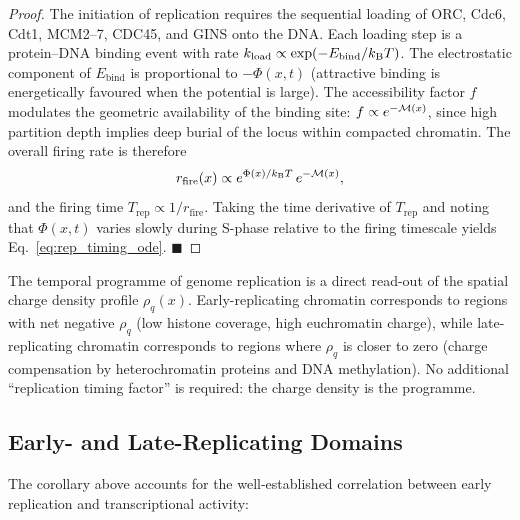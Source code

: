 \begin{proof}
The initiation of replication requires the sequential loading of ORC, Cdc6,
Cdt1, MCM2--7, CDC45, and GINS onto the DNA. Each loading step is a
protein--DNA binding event with rate
$k_{\mathrm{load}} \propto \exp(-E_{\mathrm{bind}}/k_{\mathrm{B}} T)$.
The electrostatic component of $E_{\mathrm{bind}}$ is proportional to
$-\Phi(x,t)$ (attractive binding is energetically favoured when the potential
is large). The accessibility factor $f$ modulates the geometric availability
of the binding site: $f \propto e^{-\mathcal{M}(x)}$, since high partition depth
implies deep burial of the locus within compacted chromatin. The overall firing
rate is therefore
\begin{equation}
  r_{\mathrm{fire}}(x) \propto e^{\Phi(x)/k_{\mathrm{B}} T}\,e^{-\mathcal{M}(x)},
\end{equation}
and the firing time $T_{\mathrm{rep}} \propto 1/r_{\mathrm{fire}}$. Taking the
time derivative of $T_{\mathrm{rep}}$ and noting that $\Phi(x,t)$ varies
slowly during S-phase relative to the firing timescale yields
Eq.~\eqref{eq:rep_timing_ode}. $\blacksquare$
\end{proof}

\begin{corollary}
\label{cor:timing_is_charge}
The temporal programme of genome replication is a direct read-out of the
spatial charge density profile $\rho_q(x)$. Early-replicating chromatin
corresponds to regions with net negative $\rho_q$ (low histone coverage,
high euchromatin charge), while late-replicating chromatin corresponds to
regions where $\rho_q$ is closer to zero (charge compensation by
heterochromatin proteins and DNA methylation). No additional ``replication
timing factor'' is required: the charge density is the programme.
\end{corollary}

\subsection{Early- and Late-Replicating Domains}
\label{subsec:early_late}

The corollary above accounts for the well-established correlation between
early replication and transcriptional activity:

